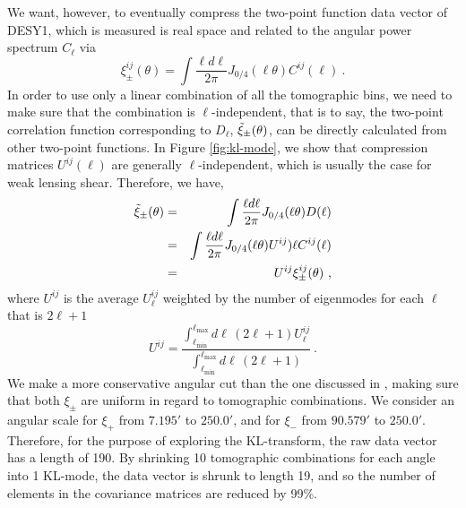 \documentclass[twocolumn]{\docclass}
\newcommand{\rf}[1]{Figure \ref{fig:#1}}
\newcommand\be{\begin{equation}}
\newcommand\ee{\end{equation}}
\def\bea{\begin{eqnarray}}
\def\eea{\end{eqnarray}}
\begin{document}
	We want, however, to eventually compress the two-point function data vector of DESY1, which is measured is real space and related to the angular power spectrum $C_{\ell}$ via
	\begin{equation*}
	\xi_{\pm}^{ij}(\theta) = \int \frac{\ell d \ell }{2\pi}J_{0/4}(\ell \theta) C^{ij}(\ell)\ 
	.\end{equation*}
	In order to use only a linear combination of all the tomographic bins, we need to make sure that the combination is $\ell$-independent, that is to say, the two-point correlation function corresponding to $D_{\ell}$, $\Tilde{\xi}_{\pm}(\theta)$, can be directly calculated from other two-point functions. In \rf{kl-mode}, we show that compression matrices $U^{ij}(\ell)$ are generally $\ell$-independent, which is usually the case for weak lensing shear. Therefore, we have, 
	\bea
	\nonumber\Tilde{\xi}_{\pm}(\theta) &=& \int \frac{\ell d \ell }{2\pi}J_{0/4}(\ell \theta) D(\ell)\\\nonumber
	&=&\int \frac{\ell d \ell }{2\pi}J_{0/4}(\ell \theta) U^{ij})\ell C^{ij}(\ell)\\
	&=&U^{ij}\xi_{\pm}^{ij}(\theta)\
	,\eea
	where $U^{ij}$ is the average $U^{ij}_{\ell}$ weighted by the number of eigenmodes for each $\ell$ that is $2\ell+1$
	\be
	U^{ij} = \frac{\int_{\ell _{\mathrm{min}}}^{\ell _{\mathrm{max}}} d\ell\, (2 \ell +1) U^{ij}_{\ell}}{\int_{\ell _{\mathrm{min}}}^{\ell _{\mathrm{max}}} d\ell\, (2 \ell +1)}\
	.\ee
	We make a more conservative angular cut than the one discussed in \cite{Troxel:2017xyo}, making sure that both $\xi_{\pm}$ are uniform in regard to tomographic combinations. We consider an angular scale for  $\xi_+$ from $7.195'$ to $250.0'$, and for $\xi_-$ from $90.579'$ to $250.0'$. Therefore, for the purpose of exploring the KL-transform, the raw data vector has a length of 190. By shrinking 10 tomographic combinations for each angle into 1 KL-mode, the data vector is shrunk to length 19, and so the number of elements in the covariance matrices are reduced by 99\%.
	
\end{document}
